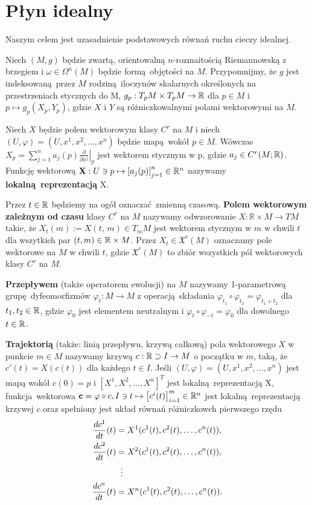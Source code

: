 \chapter{Płyn idealny} Naszym celem jest uzasadnienie podstawowych równań ruchu cieczy idealnej. 

Niech \((M, g)\) będzie zwartą, orientowalną \(n\)-rozmaitością Riemannowską z brzegiem i \(\omega \in \Omega^n(M)\) będzie formą objętości na \(M\). Przypomnijmy, że \(g\) jest indeksowaną przez \(M\) rodziną iloczynów skalarnych określonych na przestrzeniach stycznych do M, \(g_p: T_p M \times T_p M \rightarrow \mathbb{R}\) dla \(p\in M\) i \(p\mapsto g_p(X_p, Y_p)\), gdzie \(X\) i \(Y\) są różniczkowalnymi polami wektorowymi na \(M\).

Niech \(X\) będzie polem wektorowym klasy \(C^r\) na \(M\) i niech \((U, \varphi) = (U, x^1, x^2, \dots, x^n)\) będzie mapą wokół \(p\in M\). Wówczas \(X_p = \sum_{j=1}^{n}a_j(p)\left.\frac{\partial}{\partial x^j}\right|_p\) jest wektorem stycznym w p, gdzie \(a_j\in C^r(M; \mathbb{R})\). Funkcję wektorową \(\mathbf{X}: U\ni p \mapsto \left[a_j(p)\right]_{j=1}^n\in \mathbb{R}^n\) nazywamy \textbf{lokalną reprezentacją} X.

Przez \(t\in\mathbb{R}\) będziemy na ogół oznaczać zmienną czasową. \textbf{Polem wektorowym zależnym od czasu} klasy \(C^r\) na \(M\) nazywamy odwzorowanie \(X:\mathbb{R}\times M\rightarrow TM\) takie, że \(X_t(m):=X(t,\,m) \in T_{m} M\) jest wektorem stycznym w \(m\) w chwili \(t\) dla wszytkich par \((t, m) \in \mathbb{R} \times M\). Przez \(X_t\in \mathfrak{X}^r(M)\) oznaczamy pole wektorowe na \(M\) w chwili \(t\), gdzie \(\mathfrak{X}^r(M)\) to zbiór wszystkich pól wektorowych klasy \(C^r\) na \(M\). 

\textbf{Przepływem} (także operatorem ewolucji) na \(M\) nazywamy 1-parametrową grupę dyfeomorfizmów \(\varphi_t: M \rightarrow M\) z operacją składania \(\varphi_{t_1}\circ\varphi_{t_2} = \varphi_{t_1 + t_2}\) dla \(t_{1}, {t}_2 \in \mathbb{R}\), gdzie \(\varphi_0\) jest elementem neutralnym i \(\varphi_{t}\circ\varphi_{-t} = \varphi_0\) dla dowolnego \(t\in\mathbb{R}\).  

\textbf{Trajektorią} (także: linią przepływu, krzywą całkową) pola wektorowego \(X\) w punkcie \(m\in M\) nazywamy krzywą \(c: \mathbb{R} \supset I \rightarrow M\) o początku w \(m\), taką, że \(c'(t) = X(c(t))\) dla każdego \(t\in I\). Jeśli \((U, \varphi) = (U, x^1, x^2, \dots, x^n)\) jest mapą wokół \(c(0)=p\) i \([X^1, X^2, \dots, X^n]^T\) jest lokalną reprezentacją X, funkcja wektorowa \(\mathbf{c} = \varphi \circ c, I \ni t \mapsto \left[c^i(t)\right]_{i=1}^m \in \mathbb{R}^n\) jest lokalną reprezentacją krzywej \(c\) oraz spełniony jest układ równań różniczkowch pierwszego rzędu
\begin{align*}
    \frac{dc^1}{dt}(t) &= X^1(c^1(t), c^2(t), \dots, c^n(t)),\\
    \frac{dc^2}{dt}(t) &= X^2(c^1(t), c^2(t), \dots, c^n(t)),\\
    &\mathrel{\makebox[\widthof{=}]{\vdots}}  \\
    \frac{dc^n}{dt}(t) &= X^n(c^1(t), c^2(t), \dots, c^n(t)).
\end{align*}


